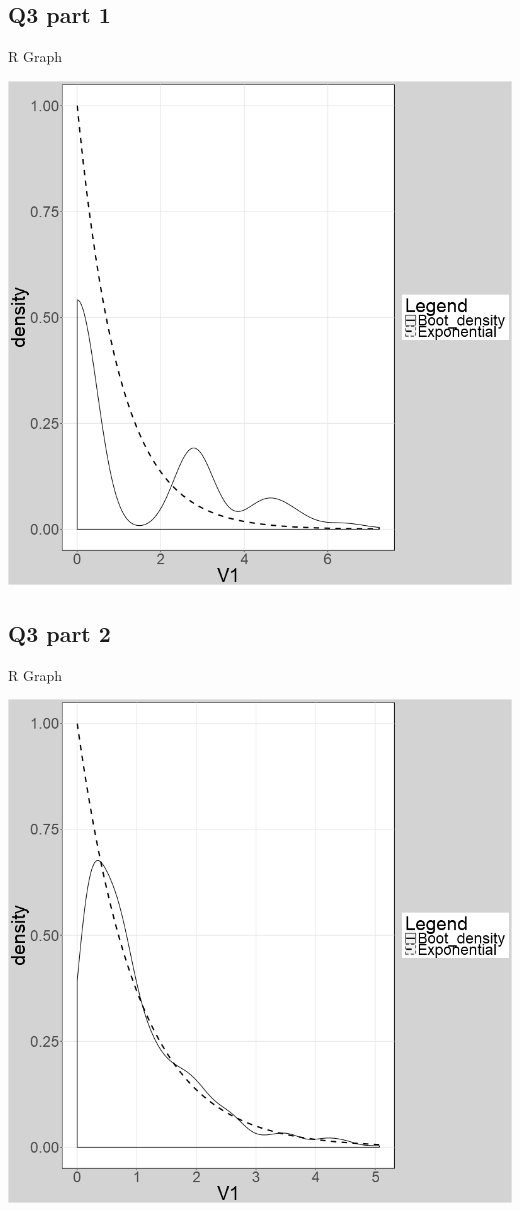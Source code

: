 \documentclass[11pt]{article}
\begin{document}
\subsection{Q3 part 1}
\centerline{R Graph }
\begin{center}
	\includegraphics[width=.8\linewidth]{plot_q3_1.png}	
\end{center}


\subsection{Q3 part 2}
\centerline{R Graph }
\begin{center}
	\includegraphics[width=.8\linewidth]{plot_q3_2.png}	
\end{center}


\end{document}
